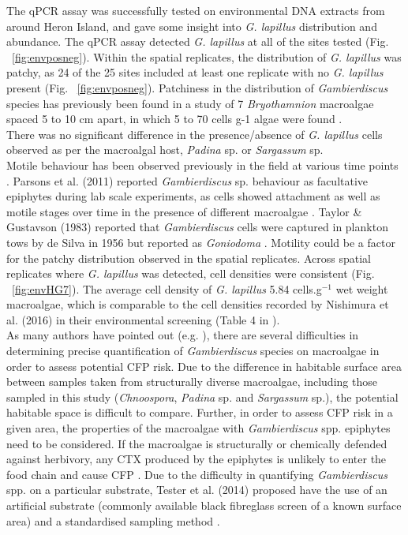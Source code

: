 \documentclass[10pt,letterpaper]{article}
\begin{document}
The qPCR assay was successfully tested on environmental DNA extracts from around Heron Island, and gave some insight into \emph{G. lapillus} distribution and abundance. 
The qPCR assay detected \emph{G. lapillus} at all of the sites tested (Fig. ~\ref{fig:envposneg}). 
Within the spatial replicates, the distribution of \emph{G. lapillus} was patchy, as 24 of the 25 sites included at least one replicate with no \textit{G. lapillus} present (Fig. ~\ref{fig:envposneg}). 
Patchiness in the distribution of \textit{Gambierdiscus} species has previously been found in a study of 7 \emph{Bryothamnion} macroalgae spaced 5 to 10 cm apart, in which 5 to 70 cells g-1 algae were found \citep{taylor1986underwater}.\\
There was no significant difference in the presence/absence of \emph{G. lapillus} cells observed as per the macroalgal host, \emph{Padina} sp. or \emph{Sargassum} sp.\\
Motile behaviour has been observed previously in the field at various time points \citep{yasumoto1977finding,bomber1987ecology}. 
Parsons et al. (2011) reported \emph{Gambierdiscus} sp. behaviour as facultative epiphytes during lab scale experiments, as cells showed attachment as well as motile stages over time in the presence of different macroalgae \citep{parsons2011examination}. 
Taylor \& Gustavson (1983) reported that \emph{Gambierdiscus} cells were captured in plankton tows by de Silva in 1956 but reported as \emph{Goniodoma} \citep{taylor1986underwater}.
Motility could be a factor for the patchy distribution observed in the spatial replicates. 
Across spatial replicates where \emph{G. lapillus} was detected, cell densities were consistent (Fig. ~\ref{fig:envHG7}). 
The average cell density of \emph{G. lapillus} 5.84 cells.g$^{-1}$ wet weight macroalgae, which is comparable to the cell densities recorded by Nishimura et al. (2016) in their environmental screening (Table 4 in \citep{nishimura2016quantitative}).\\

As many authors have pointed out (e.g. \citep{litaker2010global,bomber1989epiphytism,tester2014sampling,cruz2006macroalgal,parsons2011examination,globalcig,lobel1988assessment}), there are several difficulties in determining precise quantification of \textit{Gambierdiscus} species on macroalgae in order to assess potential CFP risk. 
Due to the difference in habitable surface area between samples taken from structurally diverse macroalgae, including those sampled in this study (\emph{Chnoospora}, \emph{Padina} sp. and \emph{Sargassum} sp.), the potential habitable space is difficult to compare. 
Further, in order to assess CFP risk in a given area, the properties of the macroalgae with \emph{Gambierdiscus} spp. epiphytes need to be considered. 
If the macroalgae is structurally or chemically defended against herbivory, any CTX produced by the epiphytes is unlikely to enter the food chain and cause CFP \citep{cruz2006macroalgal}. 
Due to the difficulty in quantifying \emph{Gambierdiscus} spp. on a particular substrate, Tester et al. (2014) proposed have the use of an artificial substrate (commonly available black fibreglass screen of a known surface area) and a standardised sampling method \citep{tester2014sampling}.
\end{document}
